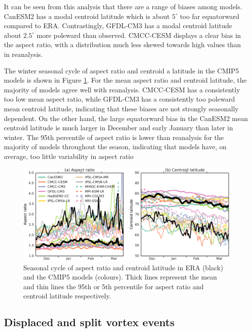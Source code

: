 It can be seen from this analysis that there are a range of biases among
models. CanESM2 has a modal centroid latitude which is about $5^{\circ}$ too far
equatorward compared to ERA. Contrastingly, GFDL-CM3 has a modal centroid
latitude about $2.5^{\circ}$ more poleward than observed. CMCC-CESM displays a
clear bias in the aspect ratio, with a distribution much less skewed towards
high values than in reanalysis.

The winter seasonal cycle of aspect ratio and centroid a latitude in the CMIP5
models is shown in Figure \ref{fig:cmip5_moments_stats_seas}. For the mean
aspect ratio and centroid latitude, the majority of models agree well with
reanalysis. CMCC-CESM has a consistently too low mean aspect ratio, while
GFDL-CM3 has a consistently too poleward mean centroid latitude, indicating that
these biases are not strongly seasonally dependent. On the other hand, the large
equatorward bias in the CanESM2 mean centroid latitude is much larger in
December and early January than later in winter. The 95th percentile of aspect
ratio is lower than reanalysis for the majority of models throughout the season,
indicating that models have, on average, too little variability in aspect ratio
 
\begin{figure}
 \centering
 \noindent\includegraphics[width=\textwidth]{figures/chapter-models/moments_seasonal_stats.pdf}
 \caption[Seasonal cycle of moment diagnostics in the CMIP5 models]{Seasonal
   cycle of aspect ratio and centroid latitude in ERA (black) and the CMIP5
   models (colours). Thick lines represent the mean and thin lines the 95th or
   5th percentile for aspect ratio and centroid latitude respectively.}
 \label{fig:cmip5_moments_stats_seas}
\end{figure}


\subsection{Displaced and split vortex events}

